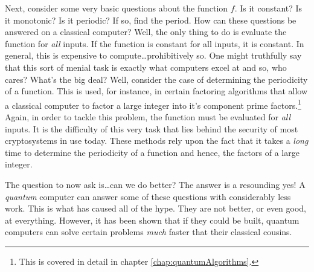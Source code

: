 Next, consider some very basic questions about the function $f$.
Is it constant? %
Is it monotonic?  Is it periodic?  If so, find the period.
How can these questions be answered on a classical computer?
Well, the only thing to do is evaluate the function for \emph{all} 
inputs.  If the function is constant for all inputs, it is constant.
In general, this is expensive to compute\dots prohibitively so.  
One might truthfully
say that this sort of menial task is exactly what computers excel
at and so, who cares?  What's the big deal?  Well, consider the 
case of determining the periodicity of a function.  This is used,
for instance, in certain factoring algorithms that allow a classical
computer to factor a large integer into it's component prime 
factors.\footnote{This is covered in detail in chapter 
\ref{chap:quantumAlgorithms}.}
Again, in order to tackle this problem, the function must be evaluated
for \emph{all} inputs.  It is the difficulty of this very task
that lies behind the security of most cryptosystems in use today.
These methods rely upon the fact that it takes a \emph{long} time 
to determine the periodicity of a function and hence,
the factors of a large integer.  

The question to now ask is\dots can we do better?  The answer is a
resounding yes!  A \emph{quantum} computer can answer some of these
questions with considerably less work.  This is what has caused all
of the hype.  They are not better, or even good, at everything.  
However, it has been shown that if they could be built,
quantum computers can solve certain problems \emph{much} faster that
their classical cousins.

